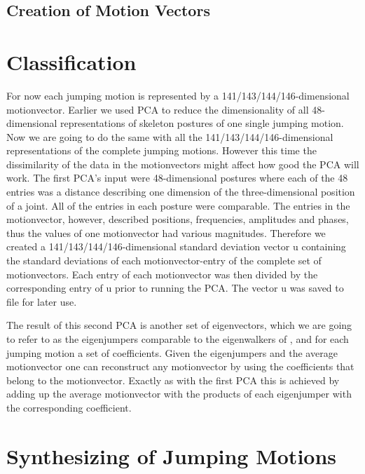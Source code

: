 \documentclass[a4paper]{article}
\begin{document}
\subsection{Creation of Motion Vectors}




\section{Classification}

For now each jumping motion is represented by a 141/143/144/146-dimensional motionvector.
Earlier we used PCA to reduce the dimensionality of all 48-dimensional representations of skeleton postures of one single jumping motion.
Now we are going to do the same with all the 141/143/144/146-dimensional representations of the complete jumping motions.
However this time the dissimilarity of the data in the motionvectors might affect how good the PCA will work.
The first PCA's input were 48-dimensional postures where each of the 48 entries was a distance describing one dimension of the three-dimensional position of a joint.
All of the entries in each posture were comparable.
The entries in the motionvector, however, described positions, frequencies, amplitudes and phases, thus the values of one motionvector had various magnitudes.
Therefore we created a 141/143/144/146-dimensional standard deviation vector u containing the standard deviations of each motionvector-entry of the complete set of motionvectors.
Each entry of each motionvector was then divided by the corresponding entry of u prior to running the PCA.
The vector u was saved to file for later use.

The result of this second PCA is another set of eigenvectors, which we are going to refer to as the eigenjumpers comparable to the eigenwalkers of \cite{origin}, and for each jumping motion a set of coefficients.
Given the eigenjumpers and the average motionvector one can reconstruct any motionvector by using the coefficients that belong to the motionvector.
Exactly as with the first PCA this is achieved by adding up the average motionvector with the products of each eigenjumper with the corresponding coefficient.

\section{Synthesizing of Jumping Motions}
\end{document}
